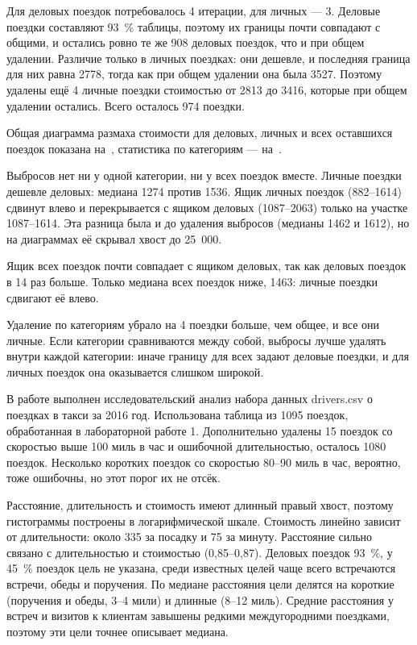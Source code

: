 \documentclass[a4paper,14pt]{extarticle}
\begin{document}

Для деловых поездок потребовалось 4 итерации, для личных — 3. Деловые поездки составляют 93~\% таблицы, поэтому их границы почти совпадают с общими, и остались ровно те же 908 деловых поездок, что и при общем удалении. Различие только в личных поездках: они дешевле, и последняя граница для них равна 2778, тогда как при общем удалении она была 3527. Поэтому удалены ещё 4 личные поездки стоимостью от 2813 до 3416, которые при общем удалении остались. Всего осталось 974 поездки.

Общая диаграмма размаха стоимости для деловых, личных и всех оставшихся поездок показана на~, статистика по категориям — на~.



Выбросов нет ни у одной категории, ни у всех поездок вместе. Личные поездки дешевле деловых: медиана 1274 против 1536. Ящик личных поездок (882–1614) сдвинут влево и перекрывается с ящиком деловых (1087–2063) только на участке 1087–1614. Эта разница была и до удаления выбросов (медианы 1462 и 1612), но на диаграммах её скрывал хвост до 25~000.

Ящик всех поездок почти совпадает с ящиком деловых, так как деловых поездок в 14 раз больше. Только медиана всех поездок ниже, 1463: личные поездки сдвигают её влево.

Удаление по категориям убрало на 4 поездки больше, чем общее, и все они личные. Если категории сравниваются между собой, выбросы лучше удалять внутри каждой категории: иначе границу для всех задают деловые поездки, и для личных поездок она оказывается слишком широкой.

\suaiconclusion

В работе выполнен исследовательский анализ набора данных drivers.csv о поездках в такси за 2016 год. Использована таблица из 1095 поездок, обработанная в лабораторной работе 1. Дополнительно удалены 15 поездок со скоростью выше 100 миль в час и ошибочной длительностью, осталось 1080 поездок. Несколько коротких поездок со скоростью 80–90 миль в час, вероятно, тоже ошибочны, но этот порог их не отсёк.

Расстояние, длительность и стоимость имеют длинный правый хвост, поэтому гистограммы построены в логарифмической шкале. Стоимость линейно зависит от длительности: около 335 за посадку и 75 за минуту. Расстояние сильно связано с длительностью и стоимостью (0,85–0,87). Деловых поездок 93~\%, у 45~\% поездок цель не указана, среди известных целей чаще всего встречаются встречи, обеды и поручения. По медиане расстояния цели делятся на короткие (поручения и обеды, 3–4 мили) и длинные (8–12 миль). Средние расстояния у встреч и визитов к клиентам завышены редкими междугородними поездками, поэтому эти цели точнее описывает медиана.
\end{document}
